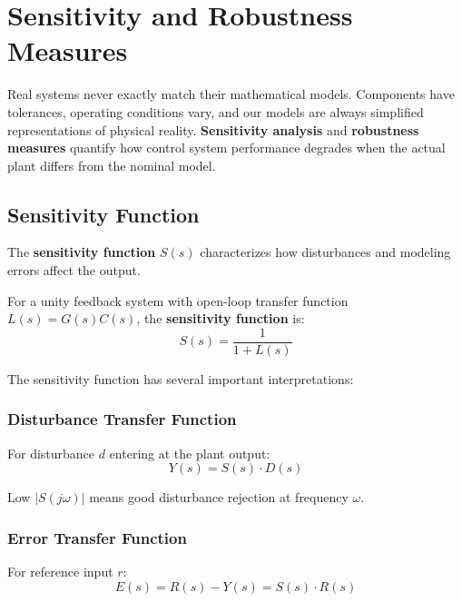 \section{Sensitivity and Robustness Measures}
\label{sec:sensitivity}

Real systems never exactly match their mathematical models. Components have tolerances, operating conditions vary, and our models are always simplified representations of physical reality. \textbf{Sensitivity analysis} and \textbf{robustness measures} quantify how control system performance degrades when the actual plant differs from the nominal model.

\subsection{Sensitivity Function}

The \textbf{sensitivity function} $S(s)$ characterizes how disturbances and modeling errors affect the output.

\begin{definition}
For a unity feedback system with open-loop transfer function $L(s) = G(s)C(s)$, the \textbf{sensitivity function} is:
\begin{equation}
    S(s) = \frac{1}{1 + L(s)}
\end{equation}
\end{definition}

The sensitivity function has several important interpretations:

\subsubsection{Disturbance Transfer Function}

For disturbance $d$ entering at the plant output:
\begin{equation}
    Y(s) = S(s) \cdot D(s)
\end{equation}

Low $|S(j\omega)|$ means good disturbance rejection at frequency $\omega$.

\subsubsection{Error Transfer Function}

For reference input $r$:
\begin{equation}
    E(s) = R(s) - Y(s) = S(s) \cdot R(s)
\end{equation}

